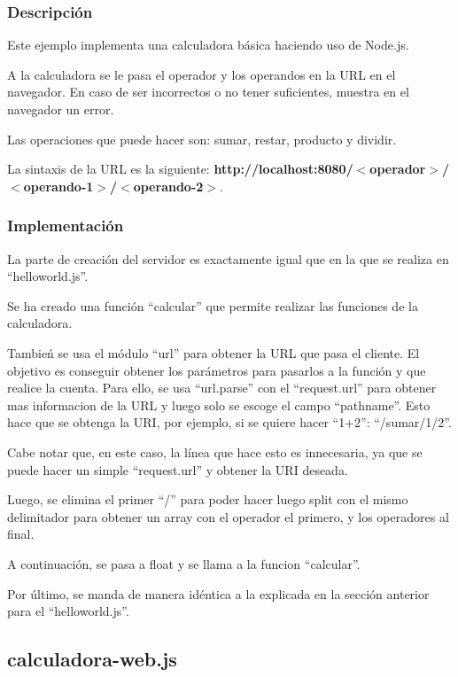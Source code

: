 \documentclass{article}
\begin{document}
\subsubsection{Descripción}
Este ejemplo implementa una calculadora básica haciendo uso de Node.js. 

A la calculadora se le pasa el operador y los operandos en la URL en el navegador. En caso de ser incorrectos o no tener suficientes, muestra en el navegador un error.

Las operaciones que puede hacer son: sumar, restar, producto y dividir.

La sintaxis de la URL es la siguiente: \textbf{http://localhost:8080/$<$operador$>$/$<$operando-1$>$/$<$operando-2$>$}.



\subsubsection{Implementación}
La parte de creación del servidor es exactamente igual que en la que se realiza en ``helloworld.js''.

Se ha creado una función ``calcular'' que permite realizar las funciones de la calculadora.

Tambień se usa el módulo ``url'' para obtener la URL que pasa el cliente. El objetivo es conseguir obtener los parámetros para pasarlos a la función y que realice la cuenta. Para ello, se usa ``url.parse'' con el ``request.url'' para obtener mas informacion de la URL y luego solo se escoge el campo ``pathname''. Esto hace que se obtenga la URI, por ejemplo, si se quiere hacer ``1+2'': ``/sumar/1/2''.

Cabe notar que, en este caso, la línea que hace esto es innecesaria, ya que se puede hacer un simple ``request.url'' y obtener la URI deseada.


Luego, se elimina el primer ``/'' para poder hacer luego split con el mismo delimitador para obtener un array con el operador el primero, y los operadores al final.

A continuación, se pasa a float y se llama a la funcion ``calcular''.

Por último, se manda de manera idéntica a la explicada en la sección anterior para el ``helloworld.js''.


\subsection{calculadora-web.js}
\end{document}
